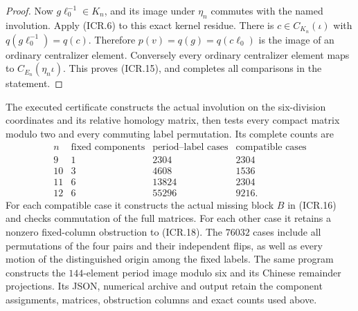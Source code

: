 \begin{proof}
Now $g\ell_0^{-1}\in K_n$, and its image under $\eta_n$ commutes
with the named involution.  Apply (ICR.6) to this exact kernel
residue.  There is $c\in C_{K_n}(\iota)$ with
$q(g\ell_0^{-1})=q(c)$.  Therefore
$p(v)=q(g)=q(c\ell_0)$ is the image of an ordinary centralizer
element.  Conversely every ordinary centralizer element maps to
$C_{E_n}(\eta_n\iota)$.  This proves (ICR.15), and completes
all comparisons in the statement.
\end{proof}

The executed certificate
 constructs the
actual involution on the six-division coordinates and its relative
homology matrix, then tests every compact matrix modulo two and
every commuting label permutation.  Its complete counts are
\[
 \begin{array}{c|r|r|r}
 n&\text{fixed components}&\text{period--label cases}
                       &\text{compatible cases}\\\hline
 9&1&2304&2304\\
 10&3&4608&1536\\
 11&6&13824&2304\\
 12&6&55296&9216.
 \end{array}                                                   \tag{ICR.21}
\]
For each compatible case it constructs the actual missing block
$B$ in (ICR.16) and checks commutation of the full matrices.
For each other case it retains a nonzero fixed-column obstruction
to (ICR.18).  The $76032$ cases include all permutations of the four pairs
and their independent flips, as well as every motion of the
distinguished origin among the fixed labels.  The same program
constructs the $144$-element period image modulo six and its
Chinese remainder projections.  Its JSON, numerical archive and
output retain the component assignments, matrices, obstruction
columns and exact counts used above.
